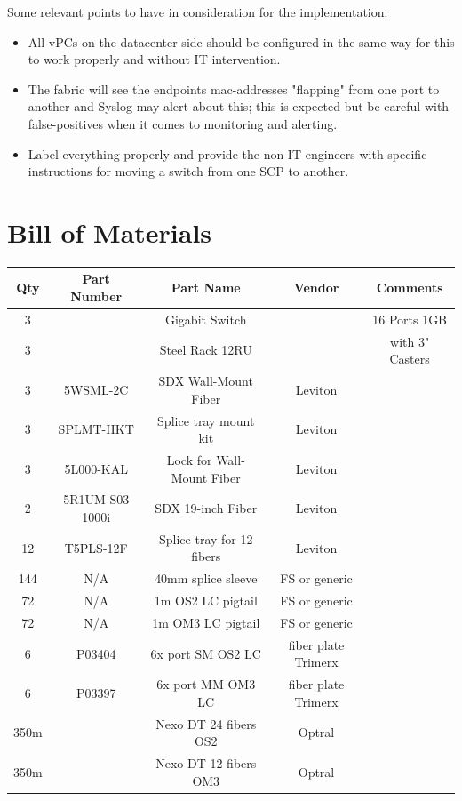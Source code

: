     Some relevant points to have in consideration for the implementation:
    \begin{itemize}
      \item All vPCs on the datacenter side should be configured in the same way for this to work properly and without IT intervention.
      \item The fabric will see the endpoints mac-addresses "flapping" from one port to another and Syslog may alert about this; this is expected but be careful with false-positives when it comes to monitoring and alerting.
      \item Label everything properly and provide the non-IT engineers with specific instructions for moving a switch from one SCP to another.
    \end{itemize}

 \newpage
\section{Bill of Materials}

\begin{flushleft}\begin{tabular}{|c|c|c|c|c|}
  \hline
  Qty & Part Number & Part Name & Vendor & Comments \\ 
  \hline
  3 &  & Gigabit Switch &  & 16 Ports 1GB \\ 
  \hline
  3 &  & Steel Rack 12RU  &  & with 3" Casters  \\ 
  \hline
  3 & 5WSML-2C & SDX Wall-Mount Fiber  & Leviton    \\ 
  \hline
  3	& SPLMT-HKT	& Splice tray mount kit	& Leviton  \\
  \hline
  3	& 5L000-KAL	& Lock for Wall-Mount Fiber 	& Leviton  \\
  \hline
  2	& 5R1UM-S03	1000i & SDX 19-inch Fiber 	& Leviton  \\
  \hline
  12 &	T5PLS-12F	& Splice tray for 12 fibers	& Leviton \\
  \hline
  144	& N/A	& 40mm splice sleeve	& FS or generic	 \\
  \hline
  72	& N/A	& 1m OS2 LC pigtail	& FS or generic  \\
  \hline
  72 &	N/A	& 1m OM3 LC pigtail	& FS or generic \\
  \hline
  6	& P03404	& 6x port SM OS2 LC & fiber plate	Trimerx  \\
  \hline
  6	& P03397	& 6x port MM OM3 LC & fiber plate	Trimerx  \\
  \hline
  350m && Nexo DT 24 fibers OS2	& Optral  \\
  \hline
  350m && Nexo DT 12 fibers OM3	& Optral \\
  \hline
  \end{tabular}\end{flushleft}

